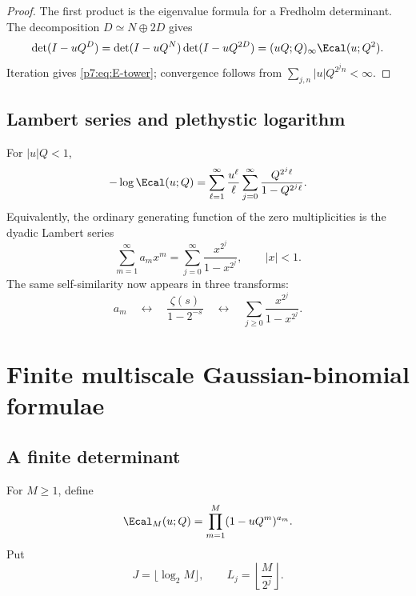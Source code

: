 \documentclass[11pt]{article}
\numberwithin{equation}{section}
\theoremstyle{definition}
\theoremstyle{remark}
\begin{document}
\begin{proof}
The first product is the eigenvalue formula for a Fredholm determinant.  The decomposition $D\simeq N\oplus2D$ gives
\[
 \det(I-uQ^D)=\det(I-uQ^N)\det(I-uQ^{2D})
 =(uQ;Q)_\infty\Ecal(u;Q^2).
\]
Iteration gives \cref{p7:eq:E-tower}; convergence follows from $\sum_{j,n}|u|Q^{2^jn}<\infty$.
\end{proof}

\subsection{Lambert series and plethystic logarithm}

For $|u|Q<1$,
\begin{equation}\label{p7:eq:E-log}
 -\log\Ecal(u;Q)
 =\sum_{\ell=1}^{\infty}\frac{u^\ell}{\ell}
 \sum_{j=0}^{\infty}\frac{Q^{2^j\ell}}{1-Q^{2^j\ell}}.
\end{equation}
Equivalently, the ordinary generating function of the zero multiplicities is the dyadic Lambert series
\begin{equation}\label{p7:eq:a-ogf}
 \boxed{\ \sum_{m=1}^{\infty}a_mx^m
 =\sum_{j=0}^{\infty}\frac{x^{2^j}}{1-x^{2^j}},\qquad |x|<1.\ }
\end{equation}
The same self-similarity now appears in three transforms:
\[
 a_m\quad\longleftrightarrow\quad
 \frac{\zeta(s)}{1-2^{-s}}
 \quad\longleftrightarrow\quad
 \sum_{j\ge0}\frac{x^{2^j}}{1-x^{2^j}}.
\]

\section{Finite multiscale Gaussian-binomial formulae}

\subsection{A finite determinant}

For $M\ge1$, define
\begin{equation}\label{p7:eq:EM}
 \Ecal_M(u;Q)=\prod_{m=1}^{M}(1-uQ^m)^{a_m}.
\end{equation}
Put
\[
 J=\lfloor\log_2M\rfloor,
 \qquad
 L_j=\left\lfloor\frac{M}{2^j}\right\rfloor.
\]
\end{document}
